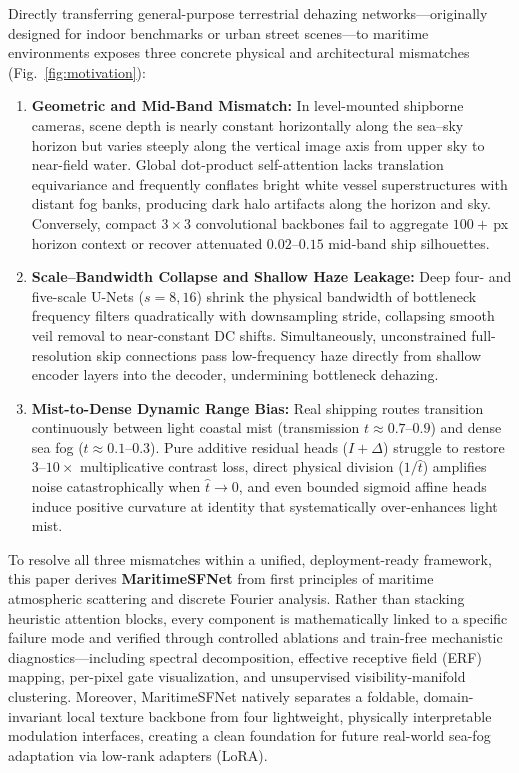 \documentclass[journal,twoside]{IEEEtran}
\begin{document}
Directly transferring general-purpose terrestrial dehazing networks---originally designed for indoor benchmarks or urban street scenes---to maritime environments exposes three concrete physical and architectural mismatches (Fig.~\ref{fig:motivation}):
\begin{enumerate}
    \item \textbf{Geometric and Mid-Band Mismatch:} In level-mounted shipborne cameras, scene depth is nearly constant horizontally along the sea--sky horizon but varies steeply along the vertical image axis from upper sky to near-field water. Global dot-product self-attention lacks translation equivariance and frequently conflates bright white vessel superstructures with distant fog banks, producing dark halo artifacts along the horizon and sky. Conversely, compact $3\times 3$ convolutional backbones fail to aggregate $100+$\,px horizon context or recover attenuated $0.02\text{--}0.15$ mid-band ship silhouettes.
    \item \textbf{Scale--Bandwidth Collapse and Shallow Haze Leakage:} Deep four- and five-scale U-Nets ($s=8, 16$) shrink the physical bandwidth of bottleneck frequency filters quadratically with downsampling stride, collapsing smooth veil removal to near-constant DC shifts. Simultaneously, unconstrained full-resolution skip connections pass low-frequency haze directly from shallow encoder layers into the decoder, undermining bottleneck dehazing.
    \item \textbf{Mist-to-Dense Dynamic Range Bias:} Real shipping routes transition continuously between light coastal mist (transmission $t \approx 0.7\text{--}0.9$) and dense sea fog ($t \approx 0.1\text{--}0.3$). Pure additive residual heads ($I+\Delta$) struggle to restore $3\text{--}10\times$ multiplicative contrast loss, direct physical division ($1/\hat{t}$) amplifies noise catastrophically when $\hat{t}\to 0$, and even bounded sigmoid affine heads induce positive curvature at identity that systematically over-enhances light mist.
\end{enumerate}

To resolve all three mismatches within a unified, deployment-ready framework, this paper derives \textbf{MaritimeSFNet} from first principles of maritime atmospheric scattering and discrete Fourier analysis. Rather than stacking heuristic attention blocks, every component is mathematically linked to a specific failure mode and verified through controlled ablations and train-free mechanistic diagnostics---including spectral decomposition, effective receptive field (ERF) mapping, per-pixel gate visualization, and unsupervised visibility-manifold clustering. Moreover, MaritimeSFNet natively separates a foldable, domain-invariant local texture backbone from four lightweight, physically interpretable modulation interfaces, creating a clean foundation for future real-world sea-fog adaptation via low-rank adapters (LoRA).
\end{document}
